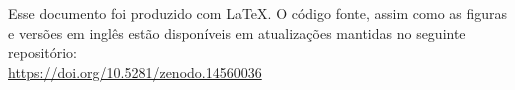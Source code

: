 \documentclass[./main.tex]{subfiles}
\begin{document}
\doublespacing %
\large

\newpage
\renewcommand{\headrulewidth}{0pt}
\thispagestyle{fancy}
\fancyhf{} %
\fancyfoot{} %
\fancyfoot[C]{\thepage}

\begin{center}
    \vspace{5mm}
\end{center}
\singlespacing
\normalsize

\setlength{\parskip}{\myparskip}

\noindent Esse documento foi produzido com \LaTeX. O código fonte, assim como as figuras e versões em inglês estão disponíveis em atualizações mantidas no seguinte repositório: \\
\noindent \href{https://doi.org/10.5281/zenodo.14560036}{https://doi.org/10.5281/zenodo.14560036}


\clearpage
\end{document}
